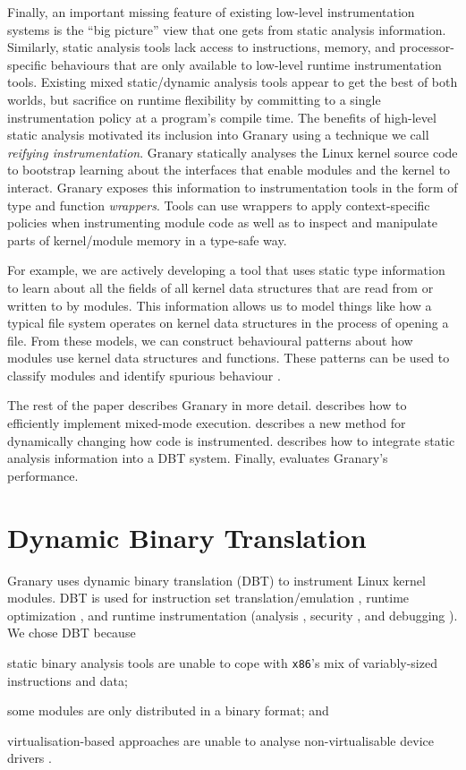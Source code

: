 \documentclass[preprint]{sigplanconf}
\begin{document}
Finally, an important missing feature of existing low-level instrumentation systems is the ``big picture'' view that one gets from static analysis information. Similarly, static analysis tools lack access to instructions, memory, and processor-specific behaviours that are only available to low-level runtime instrumentation tools. Existing mixed static/dynamic analysis tools \cite{NaCl,AddressSanitizer,ThreadSanitizer} appear to get the best of both worlds, but sacrifice on runtime flexibility by committing to a single instrumentation policy at a program's compile time. The benefits of high-level static analysis motivated its inclusion into Granary using a technique we call \emph{reifying instrumentation}. Granary statically analyses the Linux kernel source code to bootstrap learning about  the interfaces that enable modules and the kernel to interact. Granary exposes this information to instrumentation tools in the form of type and function \emph{wrappers}. Tools can use wrappers to apply context-specific policies when instrumenting module code as well as to inspect and manipulate parts of kernel/module memory in a type-safe way.

For example, we are actively developing a tool that uses static type information to learn about all the fields of all kernel data structures that are read from or written to by modules. This information allows us to model things like how a typical file system operates on kernel data structures in the process of opening a file. From these models, we can construct behavioural patterns about how modules use kernel data structures and functions. These patterns can be used to classify modules \cite{DeviceDriverClassification} and identify spurious behaviour \cite{LXFI}.

The rest of the paper describes Granary in more detail.  describes how to efficiently implement mixed-mode execution.  describes a new method for dynamically changing how code is instrumented.  describes how to integrate static analysis information into a DBT system. Finally,  evaluates Granary's performance.

\section{Dynamic Binary Translation}\label{sec:dbt}

Granary uses dynamic binary translation (DBT) to instrument Linux kernel modules. DBT is used for instruction set translation/emulation \cite{QEMU}, runtime optimization \cite{DynamoRIOOptimisation}, and runtime instrumentation (analysis \cite{DynamoRIO}, security \cite{Vx32,NaCl}, and debugging \cite{Valgrind}). We chose DBT because \begin{inparaenum}[i)]
	\item static binary analysis tools are unable to cope with \texttt{x86}'s mix of variably-sized instructions and data; 
	\item some modules are only distributed in a binary format; and
	\item virtualisation-based approaches are unable to analyse non-virtualisable device drivers \cite{DRK}.
\end{inparaenum}
\end{document}
